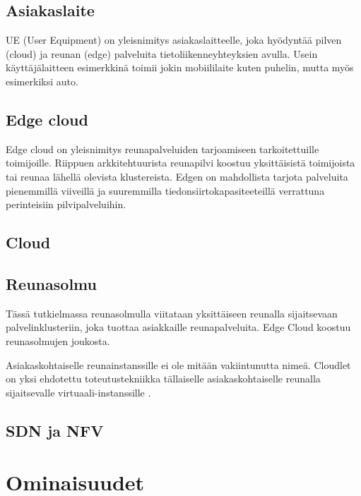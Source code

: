 \documentclass[finnish]{tktltiki2}
\theoremstyle{definition}
\theoremstyle{remark}
\begin{document}
\subsection{Asiakaslaite}
UE (User Equipment) on yleisnimitys asiakaslaitteelle, joka hyödyntää pilven (cloud) ja reunan (edge) palveluita tietoliikenneyhteyksien avulla.
Usein käyttäjälaitteen esimerkkinä toimii jokin mobiililaite kuten puhelin, mutta myös esimerkiksi auto. 

\subsection{Edge cloud}
Edge cloud on yleisnimitys reunapalveluiden tarjoamiseen tarkoitettuille toimijoille.
Riippuen arkkitehtuurista reunapilvi koostuu yksittäisistä toimijoista tai reunaa lähellä olevista klustereista.
Edgen on mahdollista tarjota palveluita pienemmillä viiveillä ja suuremmilla tiedonsiirtokapasiteeteillä verrattuna perinteisiin pilvipalveluihin. 

\subsection{Cloud}

\subsection{Reunasolmu}
Tässä tutkielmassa reunasolmulla viitataan yksittäiseen reunalla sijaitsevaan
palvelinklusteriin, joka tuottaa asiakkaille reunapalveluita. Edge Cloud koostuu reunasolmujen joukosta.

Asiakaskohtaiselle reunainstanssille ei ole mitään vakiintunutta nimeä.
Cloudlet on yksi ehdotettu toteutustekniikka tällaiselle asiakaskohtaiselle reunalla sijaitsevalle virtuaali-instanssille \cite{satya09}.

\subsection{SDN ja NFV}


\section{Ominaisuudet}
\end{document}
